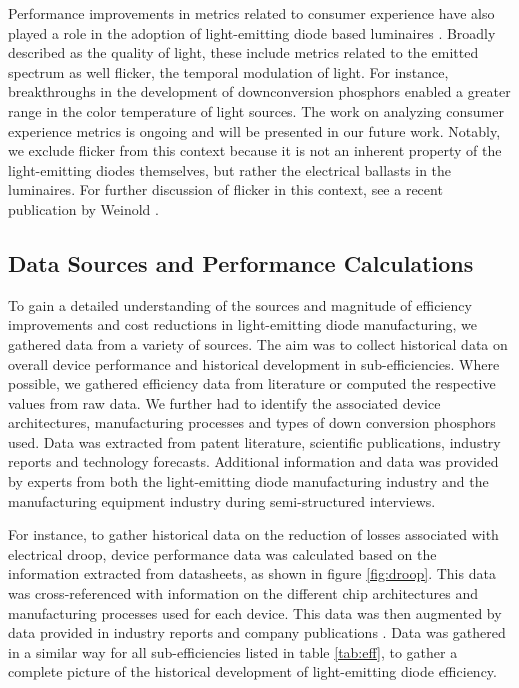 \documentclass[a4paper,nocompress]{spie}  %
\begin{document}
    Performance improvements in metrics related to consumer experience have also played a role in the adoption of light-emitting diode based luminaires \cite{cowan2011understanding}. Broadly described as the quality of light, these include metrics related to the emitted spectrum as well flicker, the temporal modulation of light. For instance, breakthroughs in the development of downconversion phosphors enabled a greater range in the color temperature of light sources. The work on analyzing consumer experience metrics is ongoing and will be presented in our future work. Notably, we exclude flicker from this context because it is not an inherent property of the light-emitting diodes themselves, but rather the electrical ballasts in the luminaires. For further discussion of flicker in this context, see a recent publication by Weinold \cite{weinold2020long}.

    \subsection{Data Sources and Performance Calculations}
    \label{subsec:data}
    
        To gain a detailed understanding of the sources and magnitude of efficiency improvements and cost reductions in light-emitting diode manufacturing, we gathered data from a variety of sources. The aim was to collect historical data on overall device performance and historical development in sub-efficiencies. Where possible, we gathered  efficiency data from literature or computed the respective values from raw data. We further had to identify the associated device architectures, manufacturing processes and types of down conversion phosphors used. Data was extracted from patent literature, scientific publications, industry reports and technology forecasts. Additional information and data was provided by experts from both the light-emitting diode manufacturing industry and the manufacturing equipment industry during semi-structured interviews. 
        
        For instance, to gather historical data on the reduction of losses associated with electrical droop, device performance data was calculated based on the information extracted from datasheets, as shown in figure \ref{fig:droop}. This data was cross-referenced with information on the different chip architectures and manufacturing processes used for each device. This data was then augmented by data provided in industry reports and company publications \cite{osram2014osram}. Data was gathered in a similar way for all sub-efficiencies listed in table \ref{tab:eff}, to gather a complete picture of the historical development of light-emitting diode efficiency.
\end{document}
